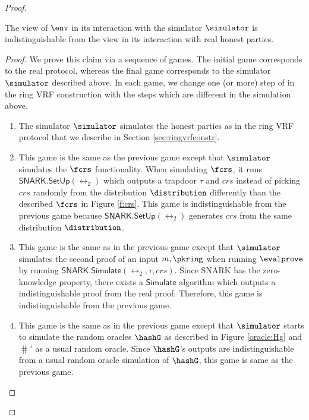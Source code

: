 \begin{proof}
	
	\begin{claim} 
		The view of $ \env $ in its interaction with the simulator $ \simulator $ is indistinguishable from the view in its interaction with real honest parties.
	\end{claim}
	
	\begin{proof}
		We prove this claim via a sequence of games. The initial game corresponds to the real protocol, whereas the final game corresponds to the simulator $\simulator$ described above. In each game, we change one (or more) step of in the ring VRF construction with the steps which are different in the simulation above.
		\begin{enumerate}[label={{Game} }{{\arabic*}}, start = 0]
			\item The simulator $ \simulator $ simulates the honest parties as in the ring VRF protocol that we describe in Section \ref{sec:ringvrfconstr}. 
			
			\item This game is the same as the previous game except that $ \simulator $ simulates the $ \fcrs $ functionality.  When simulating $ \fcrs $, it runs $ \mathsf{SNARK}.\mathsf{SetUp}(\rel_2) $ which outputs a trapdoor $ \tau $ and $ crs $ instead of picking $ crs $ randomly from the distribution $ \distribution $ differently than the described $ \fcrs $ in Figure \ref{f:crs}. This game is indistinguishable from the previous game because 
			$ \mathsf{SNARK}.\mathsf{SetUp}(\rel_2) $ generates $ crs $ from the same distribution $ \distribution $. %
			
			\item This game is the same as in the previous game except that $ \simulator $ simulates the second proof of an input $ m, \pkring $ when running $ \evalprove $ by running  $ \mathsf{SNARK}.\mathsf{Simulate}(\rel_2, \tau, crs) $. Since SNARK has the zero-knowledge property, there exists a $ \mathsf{Simulate} $ algorithm which outputs a indistinguishable proof from the real proof. Therefore, this game is indistinguishable from the previous game.
			
			\item \label{game:roracles}This game is the same as in the previous game except that $ \simulator $ starts to simulate the random oracles  $ \hashG$  as described in Figure \ref{oracle:Hg}	and $ \hash' $ as a usual random oracle. Since $ \hashG $'s outputs are indistinguishable from a usual random oracle simulation of $ \hashG $, this game is same as the previous game.
			

\end{enumerate}
\end{proof}
\end{proof}

